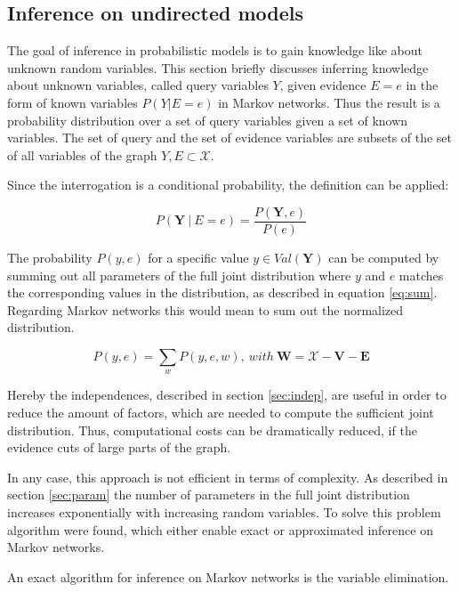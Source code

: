 \subsection{Inference on undirected models} \label{sec:infer}

The goal of inference in probabilistic models is to gain knowledge like about unknown random variables. This section briefly discusses inferring knowledge about unknown variables, called query variables $Y$, given evidence $E=e$ in the form of known variables $P(Y|E=e)$ in Markov networks. Thus the result is a probability distribution over a set of query variables given a set of known variables. The set of query and the set of evidence variables are subsets of the set of all variables of the graph $Y,E \subset \mathcal{X}$.

Since the interrogation is a conditional probability, the definition can be applied:

\begin{equation}
P(\mathbf{Y}\ |\ E=e)=\frac{P(\mathbf{Y},e)}{P(e)}
\end{equation}

The probability $P(y,e)$ for a specific value $y \in Val(\mathbf{Y})$ can be computed by summing out all parameters of the full joint distribution where $y$ and $e$ matches the corresponding values in the distribution, as described in equation \ref{eq:sum}. Regarding Markov networks this would mean to sum out the normalized distribution.

\begin{equation}
P(y,e)=\sum_w{P(y,e,w)},\ with\ \mathbf{W} = \mathcal{X} - \mathbf{V} - \mathbf{E}
\label{eq:sum}
\end{equation}

Hereby the independences, described in section \ref{sec:indep}, are useful in order to reduce the amount of factors, which are needed to compute the sufficient joint distribution. Thus, computational costs can be dramatically reduced, if the evidence cuts of large parts of the graph.

In any case, this approach is not efficient in terms of complexity. As described in section \ref{sec:param} the number of parameters in the full joint distribution increases exponentially with increasing random variables. To solve this problem algorithm were found, which either enable exact or approximated inference on Markov networks.

An exact algorithm for inference on Markov networks is the variable elimination.

